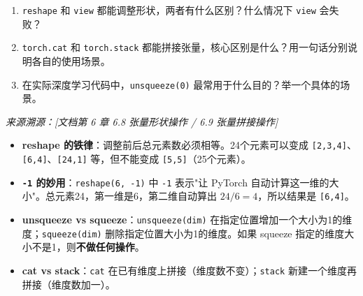 \documentclass[a4paper,11pt]{ctexart}
\begin{document}
\begin{problembox}
\begin{enumerate}[(1)]
        \item \texttt{reshape} 和 \texttt{view} 都能调整形状，两者有什么区别？什么情况下 \texttt{view} 会失败？

        \item \texttt{torch.cat} 和 \texttt{torch.stack} 都能拼接张量，核心区别是什么？用一句话分别说明各自的使用场景。

        \item 在实际深度学习代码中，\texttt{unsqueeze(0)} 最常用于什么目的？举一个具体的场景。
    \end{enumerate}

    \vspace{0.2cm}
    {\color{gray}\small\textit{来源溯源：[文档第 6 章 6.8 张量形状操作 / 6.9 张量拼接操作]}}
\end{problembox}

\begin{beginnerbox}
    \begin{itemize}
        \item \textbf{reshape 的铁律}：调整前后总元素数必须相等。24个元素可以变成 \texttt{[2,3,4]}、\texttt{[6,4]}、\texttt{[24,1]} 等，但不能变成 \texttt{[5,5]}（25个元素）。
        \item \textbf{\texttt{-1} 的妙用}：\texttt{reshape(6, -1)} 中 \texttt{-1} 表示"让 PyTorch 自动计算这一维的大小"。总元素24，第一维是6，第二维自动算出 $24/6=4$，所以结果是 \texttt{[6,4]}。
        \item \textbf{unsqueeze vs squeeze}：\texttt{unsqueeze(dim)} 在指定位置增加一个大小为1的维度；\texttt{squeeze(dim)} 删除指定位置大小为1的维度。如果 squeeze 指定的维度大小不是1，则\textbf{不做任何操作}。
        \item \textbf{cat vs stack}：\texttt{cat} 在已有维度上拼接（维度数不变）；\texttt{stack} 新建一个维度再拼接（维度数加一）。
    \end{itemize}
\end{beginnerbox}
\end{document}
